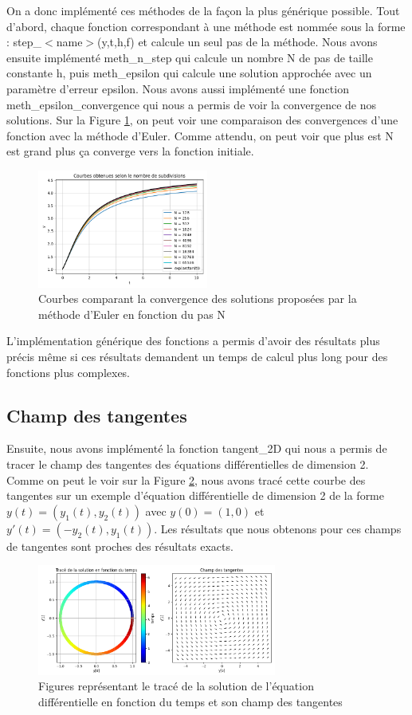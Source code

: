On a donc implémenté ces méthodes de la façon la plus générique possible. Tout d'abord, 
chaque fonction correspondant à une méthode est nommée sous la forme : step\_$<$name$>$(y,t,h,f) et calcule 
un seul pas de la méthode. Nous avons ensuite implémenté meth\_n\_step qui calcule un nombre N de pas de taille constante h,
puis meth\_epsilon qui calcule une solution approchée avec un paramètre d’erreur epsilon.
Nous avons aussi implémenté une fonction meth\_epsilon\_convergence qui nous a permis de voir
la convergence de nos solutions. Sur la Figure \ref{fig:subdivision}, on peut voir une comparaison
des convergences d'une fonction avec la méthode d'Euler. Comme attendu, on peut voir
que plus est N est grand plus ça converge vers la fonction initiale.

\begin{figure}[htbp!]
	\centering
	\includegraphics[width=0.5\textwidth]{res/subdivisions}
	\caption{Courbes comparant la convergence des solutions proposées par la méthode d'Euler en fonction du pas N}
	\label{fig:subdivision}
\end{figure}

L'implémentation générique des fonctions a permis d'avoir des résultats plus
précis même si ces résultats demandent un temps de calcul plus long pour des fonctions
plus complexes.\\
\subsection{Champ des tangentes}
Ensuite, nous avons implémenté la fonction tangent\_2D qui nous a permis de tracer le champ des tangentes
des équations différentielles de dimension 2. Comme on peut le voir sur la Figure
\ref{fig:tangente}, nous avons tracé cette courbe des tangentes sur un exemple d'équation différentielle
de dimension 2 de la forme $y(t)=(y_1(t),y_2(t))$ avec $y(0)=(1,0)$ et $y'(t)=(-y_2(t),y_1(t))$. Les résultats que nous
obtenons pour ces champs de tangentes sont proches des résultats exacts.

\begin{figure}[htbp!]
	\centering
	\includegraphics[width=0.7\textwidth]{res/tangente}
	\caption{Figures représentant le tracé de la solution de l'équation différentielle en fonction du temps et son champ des tangentes}
	\label{fig:tangente}
\end{figure}